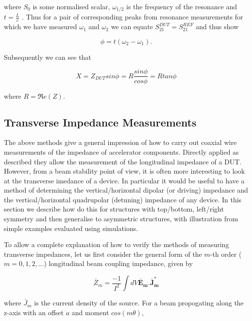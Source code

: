 \documentclass[review, number, sort&compress]{elsarticle}
\begin{document}
where $S_{0}$ is some normalised scalar, $\omega_{1/2}$ is the frequency of the resonance and $t = \frac{L}{c}$ . Thus for a pair of corresponding peaks from resonance measurements for which we have measured $\omega_{1}$ and $\omega_{2}$ we can equate $S_{21}^{DUT} = S_{21}^{REF}$ and thus show

\begin{equation}
\phi = t \left( \omega_{2} - \omega_{1} \right).
\end{equation}

Subsequently we can see that

\begin{equation}
X = Z_{DUT} sin \phi = R \frac {sin \phi}{cos \phi} = R tan \phi
\end{equation}

where $R = \Re e(Z)$.

\subsection{Transverse Impedance Measurements}

The above methods give a general impression of how to carry out coaxial wire measurements of the impedance of accelerator components. Directly applied as described they allow the measurement of the longitudinal impedance of a DUT. However, from a beam stability point of view, it is often more interesting to look at the transverse imedance of a device. In particular it would be useful to have a method of determining the vertical/horizontal dipolar (or driving) impedance and the vertical/horizontal quadrupolar (detuning) impedance of any device. In this section we describe how do this for structures with top/bottom, left/right symmetry and then generalise to asymmetric structures, with illustration from simple examples evaluated using simulations.

To allow a complete explanation of how to verify the methods of measuring transverse impedances, let us first consider the general form of the $m$-th order ($m = 0, 1, 2,...$) longitudinal beam coupling impedance, given by \cite{Chao:PhysColEff, Tsutsui:OnSingleWire}

\begin{equation}
\bar{Z}_{m} = \frac{-1}{I^{2}} \int dV \mathbf{\bar{E}_{m}. \bar{J}_{m}^{*}}
\end{equation}

where $\bar{J}_{m}$ is the current density of the source. For a beam propogating along the z-axis with an offset $a$ and moment $cos \left( m \theta \right)$,
\end{document}
